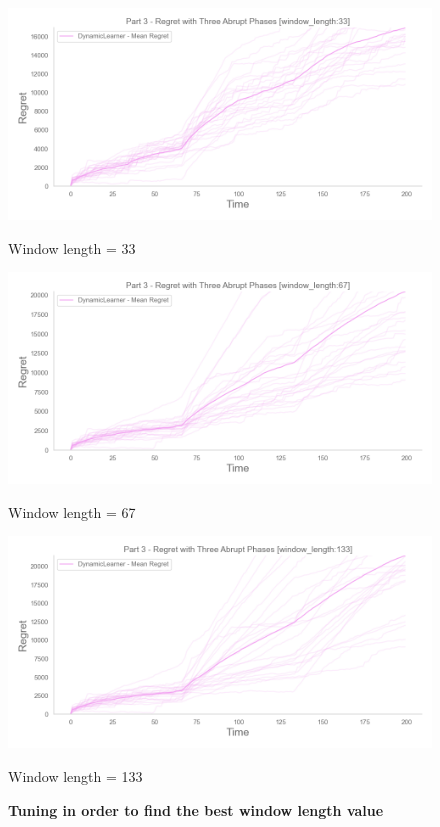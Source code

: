 \begin{figure}[!htb]
	\centering

  		\includegraphics[width=\linewidth]{images/win_length33.png}
  		\caption{Window length = 33}\label{win33}  		
	\endminipage\hfill
  		\includegraphics[width=\linewidth]{images/win_length67.png}
  		\caption{Window length = 67}\label{win67}  
	\endminipage\hfill
  		\includegraphics[width=\linewidth]{images/win_length133.png}
  		\caption{Window length = 133}\label{win133}  
	\endminipage\hfill
	
	\caption{\textbf{Tuning in order to find the best window length value}}
	\label{winLenValidationFig}
\end{figure}


